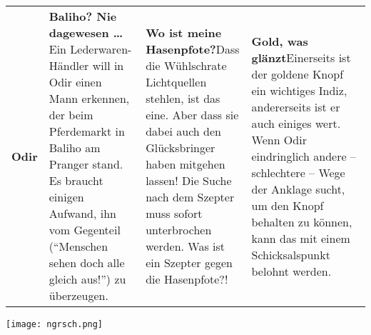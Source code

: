 \begin{tabularx}{0.98\linewidth}{l|XXX}
	\textbf{Odir}&\textbf{Baliho? Nie dagewesen \dots}\newline Ein Lederwaren-Händler will in Odir einen Mann erkennen, der beim Pferdemarkt in Baliho am Pranger stand. Es braucht einigen Aufwand, ihn vom Gegenteil (\enquote{Menschen sehen doch alle gleich aus!}) zu überzeugen.&\textbf{Wo ist meine Hasenpfote?}\newline Dass die Wühlschrate Lichtquellen stehlen, ist das eine. Aber dass sie dabei auch den Glücksbringer haben mitgehen lassen! Die Suche nach dem Szepter muss sofort unterbrochen werden. Was ist ein Szepter gegen die Hasenpfote?!&\textbf{Gold, was glänzt}\newline Einerseits ist der goldene Knopf ein wichtiges Indiz, andererseits ist er auch einiges wert. Wenn Odir eindringlich andere -- schlechtere -- Wege der Anklage sucht, um den Knopf behalten zu können, kann das mit einem Schicksalspunkt belohnt werden.\\

\end{tabularx}


\neueseite

\handout

\label{karten}
\begin{center}
	\texttt{[image: ngrsch.png]}
\end{center}

\vfill

